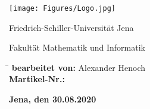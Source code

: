 \begin{titlepage}
    
    \centering 
    \texttt{[image: Figures/Logo.jpg]}
    
    \vspace{5cm}
    
    {\large Friedrich-Schiller-Universität Jena}
      
    {\large Fakultät Mathematik und Informatik}
    
    \vfill
    
    \flushleft
    
    \begin{nstabbing}
        \hspace{0.25\textwidth} \= \kill
        \textbf{bearbeitet von:} \> Alexander Henoch\\
        \textbf{Martikel-Nr.:} 
    \end{nstabbing}
    
    \vspace{2cm}
    
    \textbf{Jena, den 30.08.2020}
    
\end{titlepage}